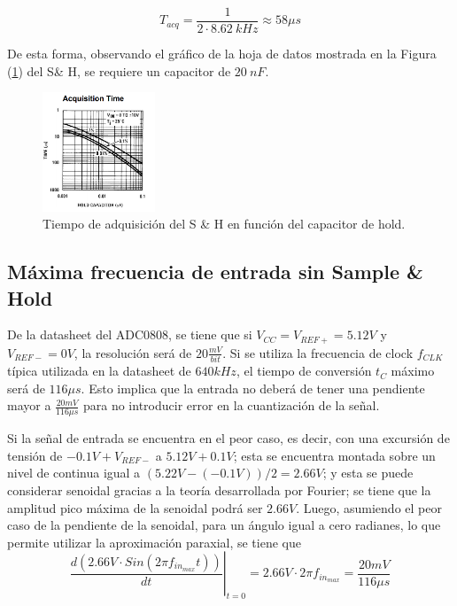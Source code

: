 \begin{equation*}
	T_{acq} = \frac{1}{2\cdot 8.62 \ kHz} \approx 58 \mu s
\end{equation*}

De esta forma, observando el gráfico de la hoja de datos mostrada en la Figura (\ref{chacqtime}) del S\& H, se requiere un capacitor de $20 \ nF$.

\begin{figure}[H]
	\centering
	\includegraphics[width=0.3\textwidth]{ImagenesEjercicio1/chacqtime.png}
\caption{Tiempo de adquisición del S \& H en función del capacitor de hold.}
	\label{chacqtime}
\end{figure}

\subsection{Máxima frecuencia de entrada sin Sample \& Hold}

De la datasheet del ADC0808, se tiene que si $V_{CC} = V_{REF+} = 5.12V$ y $V_{REF-} = 0V$, la resolución será de $20 \frac{mV}{bit}$. Si se utiliza la frecuencia de clock $f_{CLK}$ típica utilizada en la datasheet de $640kHz$, el tiempo de conversión $t_C$ máximo será de $116\mu s$. Esto implica que la entrada no deberá de tener una pendiente mayor a $\frac{20mV}{116\mu s}$ para no introducir error en la cuantización de la señal.


Si la señal de entrada se encuentra en el peor caso, es decir, con una excursión de tensión de $-0.1V + V_{REF-}$ a $5.12V + 0.1V$; esta se encuentra montada sobre un nivel de continua igual a $(5.22V - (-0.1V))/2 = 2.66V$; y esta se puede considerar senoidal gracias a la teoría desarrollada por Fourier; se tiene que la amplitud pico máxima de la senoidal podrá ser $2.66V$. Luego, asumiendo el peor caso de la pendiente de la senoidal, para un ángulo igual a cero radianes, lo que permite utilizar la aproximación paraxial, se tiene que
\\

\begin{equation}
\left. \frac{d \left( 2.66V \cdot Sin \left( 2\pi f_{in_{max}} t \right) \right)}{dt} \right|_{t=0} = 2.66V \cdot 2\pi f_{in_{max}} = \frac{20mV}{116\mu s}
\end{equation}
\\


